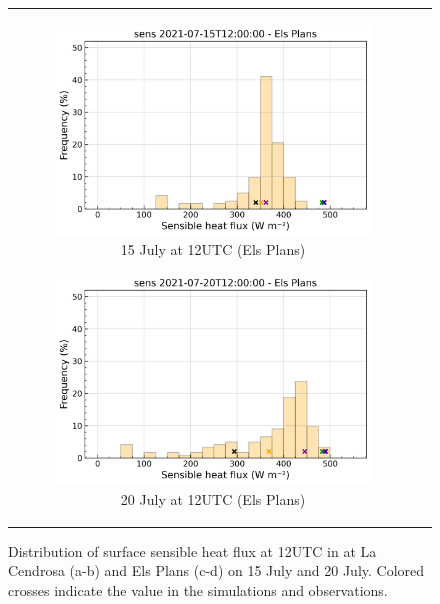 \begin{figure}[hbtp]
{\begin{tabular}{cc}
\begin{subfigure}[t]{0.48\textwidth}
            \caption{15 July at 12UTC (Els Plans)}
            \includegraphics[width=\textwidth]{images/chap5/IOP_bins/bins_sens_2021-07-15T12:00:00_elsplans.png}
        \end{subfigure}
        \begin{subfigure}[t]{0.48\textwidth}
            \caption{20 July at 12UTC (Els Plans)}
            \includegraphics[width=\textwidth]{images/chap5/IOP_bins/bins_sens_2021-07-20T12:00:00_elsplans.png}
        \end{subfigure}
    \end{tabular}
    }
    \caption{Distribution of surface sensible heat flux at 12UTC in \mesomean at La Cendrosa (a-b) and Els Plans (c-d) on 15 July and 20 July. Colored crosses indicate the value in the simulations and observations.}
    \label{fig:sens_bins}
\end{figure}

